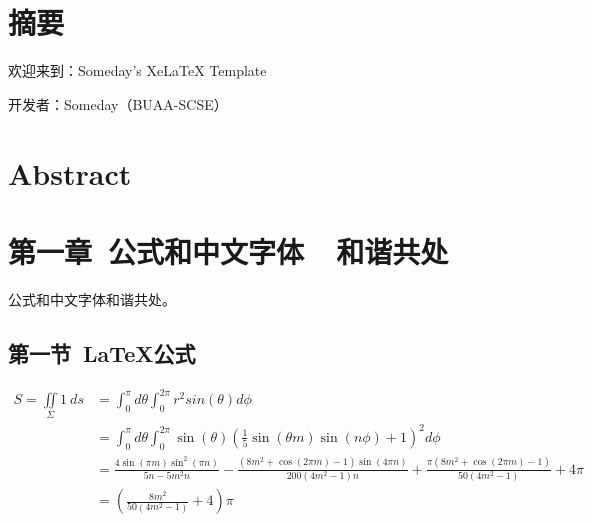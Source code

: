 \documentclass{ctexart}
\newcommand{\xiaosi}{\fontsize{12pt}{0}}
\begin{document}


\renewcommand{\headrulewidth}{0pt}%
\clearpage
{} %

\xiaosi
\section*{摘要}

欢迎来到：Someday's XeLaTeX Template\par
开发者：Someday（BUAA-SCSE）\par

\section*{Abstract}



\clearpage
\tableofcontents
\clearpage



\renewcommand{\headrulewidth}{0.4pt} %


\setcounter{page}{1} 


\section{第一章\ 公式和中文字体\ \ 和谐共处}

公式和中文字体和谐共处。\\

\subsection{第一节\ LaTeX公式}

\begin{align*}
S=\iint\limits_{\Sigma}1 \ ds &= \int_0^{\pi}d\theta \int_0^{2\pi} r^2sin(\theta) d\phi \\
&= \int_0^{\pi}d\theta \int_0^{2\pi}\sin (\theta ) \left(\frac{1}{5} \sin (\theta  m) \sin (n \phi )+1\right)^2d\phi\\
&=\frac{4 \sin (\pi  m) \sin ^2(\pi  n)}{5 n-5 m^2 n}-\frac{\left(8 m^2+\cos (2 \pi  m)-1\right) \sin (4 \pi  n)}{200 \left(4 m^2-1\right) n}+\frac{\pi  \left(8 m^2+\cos (2 \pi  m)-1\right)}{50 \left(4 m^2-1\right)}+4 \pi\\
&=  \left(\frac{8 m^2}{50 \left(4 m^2-1\right)}+4\right)\pi
\end{align*}
\end{document}
